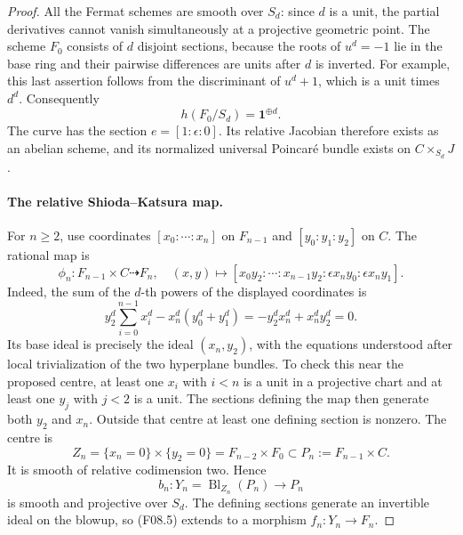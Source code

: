 \documentclass[11pt]{article}
\theoremstyle{remark}\newtheorem{remark}[theorem]{Remark}
\begin{document}
\begin{proof}
All the Fermat schemes are smooth over $S_d$: since $d$ is a unit,
the partial derivatives cannot vanish simultaneously at a projective
geometric point. The scheme $F_0$ consists of $d$ disjoint sections,
because the roots of $u^d=-1$ lie in the base ring and their pairwise
differences are units after $d$ is inverted. For example, this last
assertion follows from the discriminant of $u^d+1$, which is a unit
times $d^d$. Consequently
\[
 h(F_0/S_d)=\mathbf1^{\oplus d}.
 \tag{F08.4}
\]
The curve has the section $e=[1:\epsilon:0]$. Its relative Jacobian
therefore exists as an abelian scheme, and its normalized universal
Poincar\'e bundle exists on $C\times_{S_d}J$.

\paragraph{The relative Shioda--Katsura map.}
For $n\geq2$, use coordinates $[x_0:\cdots:x_n]$ on $F_{n-1}$
and $[y_0:y_1:y_2]$ on $C$. The rational map is
\[
 \phi_n:F_{n-1}\times C\dashrightarrow F_n,
 \quad (x,y)\longmapsto
 [x_0y_2:\cdots:x_{n-1}y_2:
       \epsilon x_ny_0:\epsilon x_ny_1].
 \tag{F08.5}
\]
Indeed, the sum of the $d$-th powers of the displayed coordinates is
\[
 y_2^d\sum_{i=0}^{n-1}x_i^d
      -x_n^d(y_0^d+y_1^d)
 =-y_2^dx_n^d+x_n^dy_2^d=0.
\]
Its base ideal is precisely the ideal $(x_n,y_2)$, with the equations
understood after local trivialization of the two hyperplane bundles.
To check this near the proposed centre, at least one $x_i$ with
$i<n$ is a unit in a projective chart and at least one $y_j$ with
$j<2$ is a unit. The sections defining the map then generate both
$y_2$ and $x_n$. Outside that centre at least one defining section
is nonzero. The centre is
\[
 Z_n=\{x_n=0\}\times\{y_2=0\}
       =F_{n-2}\times F_0
       \subset P_n:=F_{n-1}\times C.
 \tag{F08.6}
\]
It is smooth of relative codimension two. Hence
\[
 b_n:Y_n=\operatorname{Bl}_{Z_n}(P_n)\longrightarrow P_n
\]
is smooth and projective over $S_d$. The defining sections generate
an invertible ideal on the blowup, so (F08.5) extends to a morphism
$f_n:Y_n\longrightarrow F_n$.


\end{proof}
\end{document}
